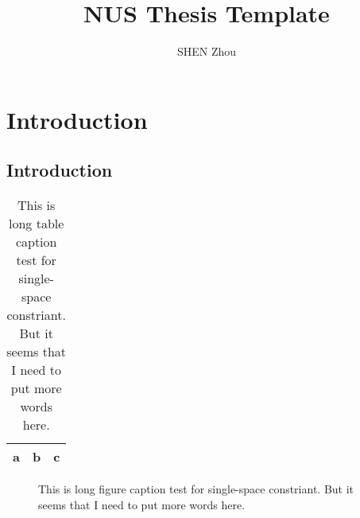 \documentclass[a4paper, 12pt]{NUSThesis}
\title{NUS Thesis Template}
\author{SHEN Zhou}
\begin{document}
\maketitle
\makedeclaration
\frontmatter
\begin{acknowledgments}
\lipsum[1-5]
\end{acknowledgments}
\tableofcontents
\begin{abstract}
\lipsum[1-3]
\end{abstract}
\listoftables
\listoffigures
\mainmatter
\chapter{Introduction}
\section{Introduction}
\lipsum[1-4]
\begin{table}[htpb]
    \centering
    \caption[short table caption]{This is long table caption test for single-space constriant. But
    it seems that I need to put more words here.}
    \begin{tabular}{ccc}
        \hline
        a & b & c\\
        \hline
    \end{tabular}
\end{table}
\lipsum[1-4]
\begin{figure}
    \centering
    \caption[short figure caption]{This is long figure caption test for single-space constriant. But
    it seems that I need to put more words here.}
\end{figure}
\end{document}
